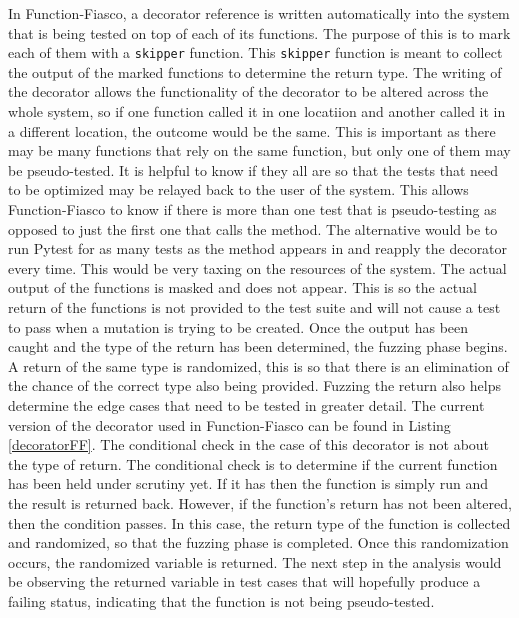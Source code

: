 In Function-Fiasco, a decorator reference is written automatically into the system that is being tested on top of each of its functions. The purpose of this is to mark each of them with a \texttt{skipper} function. This \texttt{skipper} function is meant to collect the output of the marked functions to determine the return type. The writing of the decorator allows the functionality of the decorator to be altered across the whole system, so if one function called it in one locatiion and another called it in a different location, the outcome would be the same. This is important as there may be many functions that rely on the same function, but only one of them may be pseudo-tested. It is helpful to know if they all are so that the tests that need to be optimized may be relayed back to the user of the system. This allows Function-Fiasco to know if there is more than one test that is pseudo-testing as opposed to just the first one that calls the method. The alternative would be to run Pytest for as many tests as the method appears in and reapply the decorator every time. This would be very taxing on the resources of the system.
The actual output of the functions is masked and does not appear. This is so the actual return of the functions is not provided to the test suite and will not cause a test to pass when a mutation is trying to be created.
Once the output has been caught and the type of the return has been determined, the fuzzing phase begins. A return of the same type is randomized, this is so that there is an elimination of the chance of the correct type also being provided. Fuzzing the return also helps determine the edge cases that need to be tested in greater detail.
The current version of the decorator used in Function-Fiasco can be found in Listing \ref{decoratorFF}. The conditional check in the case of this decorator is not about the type of return. The conditional check is to determine if the current function has been held under scrutiny yet. If it has then the function is simply run and the result is returned back. However, if the function's return has not been altered, then the condition passes. In this case, the return type of the function is collected and randomized, so that the fuzzing phase is completed. Once this randomization occurs, the randomized variable is returned. The next step in the analysis would be observing the returned variable in test cases that will hopefully produce a failing status, indicating that the function is not being pseudo-tested.

